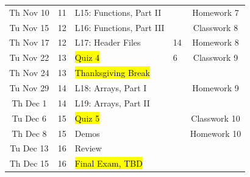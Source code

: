 \documentclass[letter,11pt]{article}
\begin{document}
\begin{tabular}{c c l l c}
Th Nov 10  & 11 & L15: Functions, Part II & & Homework 7 \\
Tu Nov 15  & 12 & L16: Functions, Part III & & Classwork 8 \\
Th Nov 17  & 12 & L17: Header Files & 14 & Homework 8 \\
Tu Nov 22  & 13 & \hl{Quiz 4} & 6 & Classwork 9 \\
Th Nov 24  & 13 & \hl{Thanksgiving Break} & & \\
Tu Nov 29  & 14 & L18: Arrays, Part I &  & Homework 9 \\ \hline
Th Dec 1   & 14 & L19: Arrays, Part II &  \\
Tu Dec 6   & 15 & \hl{Quiz 5} & & Classwork 10 \\
Th Dec 8   & 15 & Demos & & Homework 10 \\
Tu Dec 13  & 16 & Review &  \\
Th Dec 15  & 16 & \hl{Final Exam, TBD} & \\
\end{tabular}
\fi
\end{document}

